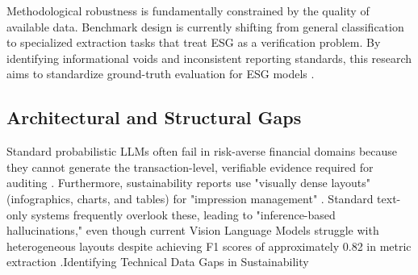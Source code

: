 \documentclass[english, online, cse, master]{dithesis}
\begin{document}
Methodological robustness is fundamentally constrained by the quality of available data. Benchmark design is currently shifting from general classification to specialized extraction tasks that treat ESG as a verification problem. By identifying informational voids and inconsistent reporting standards, this research aims to standardize ground-truth evaluation for ESG models  \parencite[]{tobias_schimanski_3549ff9f, tobias_schimanski_241ada20}.
\subsection{Architectural and Structural Gaps}

Standard probabilistic LLMs often fail in risk-averse financial domains because they cannot generate the transaction-level, verifiable evidence required for auditing  \parencite{steven_paul_nohr_a6874924}. Furthermore, sustainability reports use "visually dense layouts" (infographics, charts, and tables) for "impression management"  \parencite{bingjie_li_487d69fd}. Standard text-only systems frequently overlook these, leading to "inference-based hallucinations," even though current Vision Language Models struggle with heterogeneous layouts despite achieving F1 scores of approximately 0.82 in metric extraction  \parencite[]{g_saipooja_m_n_488bfdd6, lars_wilhelmi_8d7e860b, tanay_gupta_aafe0c6a}.Identifying Technical Data Gaps in Sustainability
\end{document}
